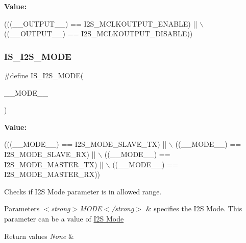 {\bfseries Value\+:}
\begin{DoxyCode}
(((\_\_OUTPUT\_\_) == I2S\_MCLKOUTPUT\_ENABLE) || \(\backslash\)
                                        ((\_\_OUTPUT\_\_) == I2S\_MCLKOUTPUT\_DISABLE))
\end{DoxyCode}
\mbox{\label{group___i2_s___private___macros_gac8d5e0a3d900566959bb21b70d89a844}} 
\subsubsection{\texorpdfstring{I\+S\+\_\+\+I2\+S\+\_\+\+M\+O\+DE}{IS\_I2S\_MODE}}
{\footnotesize\ttfamily \#define I\+S\+\_\+\+I2\+S\+\_\+\+M\+O\+DE(\begin{DoxyParamCaption}\item[{}]{\+\_\+\+\_\+\+M\+O\+D\+E\+\_\+\+\_\+ }\end{DoxyParamCaption})}

{\bfseries Value\+:}
\begin{DoxyCode}
(((\_\_MODE\_\_) == I2S\_MODE\_SLAVE\_TX)  || \(\backslash\)
                               ((\_\_MODE\_\_) == I2S\_MODE\_SLAVE\_RX)  || \(\backslash\)
                               ((\_\_MODE\_\_) == I2S\_MODE\_MASTER\_TX) || \(\backslash\)
                               ((\_\_MODE\_\_) == I2S\_MODE\_MASTER\_RX))
\end{DoxyCode}


Checks if I2S Mode parameter is in allowed range. 


\begin{DoxyParams}{Parameters}
{\em $<$strong$>$\+M\+O\+D\+E$<$/strong$>$} & specifies the I2S Mode. This parameter can be a value of \hyperlink{group___i2_s___mode}{I2S Mode} \\
\hline
\end{DoxyParams}

\begin{DoxyRetVals}{Return values}
{\em None} & \\
\hline
\end{DoxyRetVals}
\mbox{\label{group___i2_s___private___macros_ga5ce493481e32d4aebc35711ce3675088}} 
